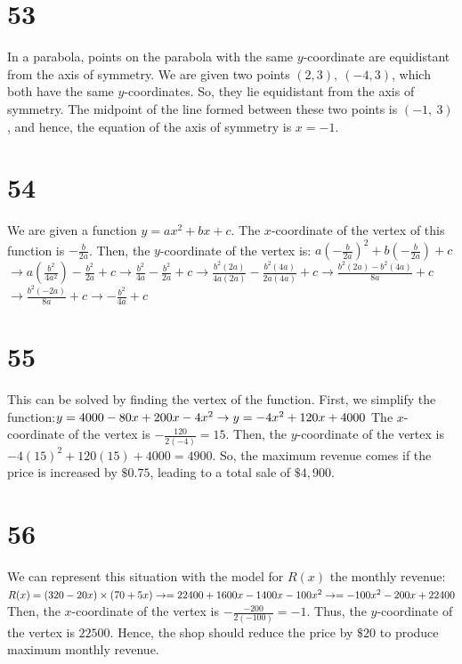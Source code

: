 \documentclass{article}
\theoremstyle{definition}
\begin{document}
\section*{53}
In a parabola, points on the parabola with the same $y$-coordinate are equidistant from the axis of symmetry. We are given two points $(2,3),\ (-4,3)$, which both have the 
same $y$-coordinates. So, they lie equidistant from the axis of symmetry. The midpoint of the line formed between these two points is $(-1,\ 3)$, and hence, the equation of 
the axis of symmetry is $x=-1$.

\section*{54}
We are given a function $y=ax^2+bx+c$. The $x$-coordinate of the vertex of this function is $-\frac{b}{2a}$. Then, the $y$-coordinate of the vertex is:\newline
$a(-\frac{b}{2a})^2+b(-\frac{b}{2a})+c$\newline$\rightarrow a(\frac{b^2}{4a^2})-\frac{b^2}{2a}+c$\newline$\rightarrow \frac{b^2}{4a}-\frac{b^2}{2a}+c$\newline$\rightarrow
\frac{b^2(2a)}{4a(2a)}-\frac{b^2(4a)}{2a(4a)}+c$\newline$\rightarrow \frac{b^2(2a)-b^2(4a)}{8a}+c$\newline$\rightarrow \frac{b^2(-2a)}{8a}+c$\newline$\rightarrow -\frac{b^2}
{4a}+c$

\section*{55}
This can be solved by finding the vertex of the function. First, we simplify the function:\newline $y=4000-80x+200x-4x^2\newline\rightarrow y=-4x^2+120x+4000$\newline
The $x$-coordinate of the vertex is $-\frac{120}{2(-4)}=15$. Then, the $y$-coordinate of the vertex is $-4(15)^2+120(15)+4000=4900$. So, the maximum revenue comes if the 
price is increased by $\$0.75$, leading to a total sale of $\$4,900$.

\section*{56}
We can represent this situation with the model for $R(x)$ the monthly revenue:\newline
$R(x)=(320-20x)\times (70+5x)\newline\rightarrow=22400+1600x-1400x-100x^2\newline\rightarrow =-100x^2-200x+22400$ Then, the $x$-coordinate of the vertex is $-\frac{-200}
{2(-100)}=-1$. Thus, the $y$-coordinate of the vertex is $22500$. Hence, the shop should reduce the price by $\$20$ to produce maximum monthly revenue.
\end{document}
